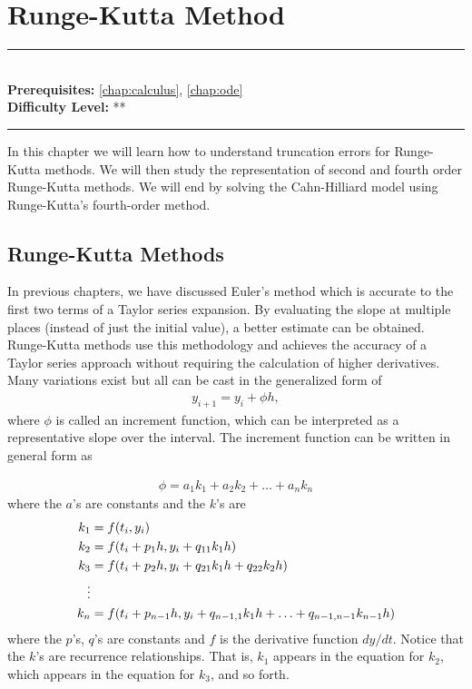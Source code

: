 \documentclass[book.tex]{subfiles}
\begin{document}
\chapter{Runge-Kutta Method}
\label{chap:runge_kutta}
\noindent\rule{11cm}{0.4pt} \\
\textbf{Prerequisites:} \autoref{chap:calculus}, \autoref{chap:ode} \\
\textbf{Difficulty Level:} ** \\
\noindent\rule{11cm}{0.4pt}
\vspace{5mm}

In this chapter we will learn how to understand truncation errors for Runge-Kutta methods. We will then study the representation of second and fourth order Runge-Kutta methods. We will end by solving the Cahn-Hilliard model using Runge-Kutta's fourth-order method.

\section{Runge-Kutta Methods}

In previous chapters, we have discussed Euler's method which is accurate to the first two terms of a Taylor series expansion. By evaluating the slope at multiple places (instead of just the initial value), a better estimate can be obtained. Runge-Kutta methods use this methodology and achieves the accuracy of a Taylor series approach without requiring the calculation of higher derivatives. Many variations exist but all can be cast in the generalized form of
\begin{align}y_{i+1} = y_{i} + \phi h,\end{align}
where $\phi$ is called an increment function, which can be interpreted as a representative slope over the interval. The increment function can be written in general form as

\begin{align}
\phi = a_{1}k_{1} + a_2k_2 + \dots + a_nk_n
\end{align}
where the $a$’s are constants and the $k$’s are
\begin{align}
	\begin{split}
		k_1 &= f(t_i,y_i) \\
		k_2 &= f(t_i + p_1h,y_i + q_{11}k_1h)\\
		k_3 &= f(t_i + p_2h,y_i + q_{21}k_1h+ q_{22}k_2h)\\	
		\vdots&\\
		k_n &= f(t_i + p_{n-1}h,y_i + q_{n-1,1}k_1h + \dots + q_{n-1,n-1}k_{n-1}h)
		\vspace{15pt}
	\end{split}
\end{align}
where the $p$’s, $q$’s are constants and $f$ is the derivative function $dy/dt$. Notice that the $k$’s are recurrence relationships. That is, $k_1$ appears in the equation for $k_2$, which appears in the equation for $k_3$, and so forth.
\end{document}
